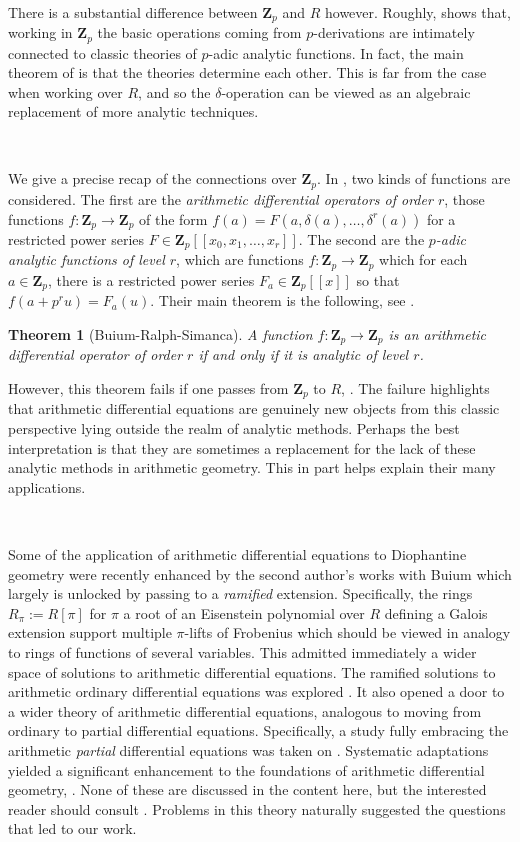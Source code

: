\documentclass[10pt]{amsart}
\theoremstyle{Theorem}
\newtheorem{thm}{Theorem}[section]
\theoremstyle{definition}
\newcommand{\ZZ}{\mathbf Z}
\renewcommand{\d}{\delta}
\begin{document}
\

There is a substantial difference between $\ZZ_p$ and $R$ however. Roughly, \cite{BRS11} shows that, working in $\ZZ_p$ the basic operations coming from $p$-derivations are intimately connected to classic theories of $p$-adic analytic functions. In fact, the main theorem of \cite{BRS11} is that the theories determine each other. This is far from the case when working over $R$, and so the $\d$-operation can be viewed as an algebraic replacement of more analytic techniques. 

\


We give a precise recap of the connections over $\ZZ_p$. In \cite{BRS11}, two kinds of functions are considered. The first are the {\it arithmetic differential operators of order $r$}, those functions $f \colon \ZZ_p \to \ZZ_p$ of the form $f(a) = F(a,\d (a), \ldots, \d^r (a))$ for a restricted power series $F \in \ZZ_p[[x_0,x_1,\ldots,x_r]]$. 
The second are the {\it $p$-adic analytic functions of level $r$}, which are functions $f \colon \ZZ_p \to \ZZ_p$ which for each $a \in \ZZ_p$, there is a restricted power series $F_a \in \ZZ_p[[x]]$ so that $f(a + p^r u) = F_a(u)$. Their main theorem is the following, see \cite[Thm. 4,5]{BRS11}.

\begin{thm}[Buium-Ralph-Simanca] 
A function $f \colon \ZZ_p \to \ZZ_p$ is an arithmetic differential operator of order $r$ if and only if it is analytic of level $r$.  
\end{thm}

 However, this theorem fails if one passes from $\ZZ_p$ to $R$, \cite[Thm. 10.1]{RS12}. The failure highlights that arithmetic differential equations are genuinely new objects from this classic perspective lying outside the realm of analytic methods. Perhaps the best interpretation is that they are sometimes a replacement for the lack of these analytic methods in arithmetic geometry. This in part helps explain their many applications. 

\

Some of the application of arithmetic differential equations to Diophantine geometry were recently enhanced by the second author's works with Buium which largely is unlocked by passing to a {\it ramified} extension. Specifically, the rings $R_\pi := R[\pi]$ for $\pi$ a root of an Eisenstein polynomial over $R$ defining a Galois extension support multiple $\pi$-lifts of Frobenius which should be viewed in analogy to rings of functions of several variables. This admitted immediately a wider space of solutions to arithmetic differential equations. The ramified solutions to arithmetic ordinary differential equations was explored \cite{BM20,BM23a}. It also opened a door to a wider theory of arithmetic differential equations, analogous to moving from ordinary to partial differential equations. Specifically, a study fully embracing the arithmetic {\it partial} differential equations was taken on \cite{BM23b}. Systematic adaptations yielded a significant enhancement to the foundations of arithmetic differential geometry, \cite{Bui17}. None of these are discussed in the content here, but the interested reader should consult \cite{BM26}. Problems in this theory naturally suggested the questions that led to our work. 
\end{document}
